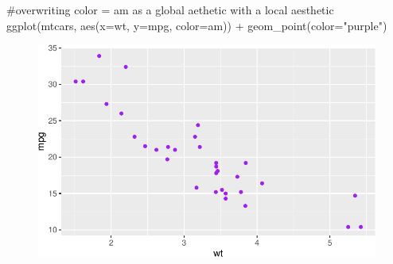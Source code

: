 \documentclass[
  letterpaper,
  DIV=11,
  numbers=noendperiod]{scrartcl}
\newenvironment{Shaded}{\begin{snugshade}}{\end{snugshade}}
\newcommand{\AttributeTok}[1]{\textcolor[rgb]{0.40,0.45,0.13}{#1}}
\newcommand{\CommentTok}[1]{\textcolor[rgb]{0.37,0.37,0.37}{#1}}
\newcommand{\FunctionTok}[1]{\textcolor[rgb]{0.28,0.35,0.67}{#1}}
\newcommand{\NormalTok}[1]{\textcolor[rgb]{0.00,0.23,0.31}{#1}}
\newcommand{\SpecialCharTok}[1]{\textcolor[rgb]{0.37,0.37,0.37}{#1}}
\newcommand{\StringTok}[1]{\textcolor[rgb]{0.13,0.47,0.30}{#1}}
\begin{document}
\begin{Shaded}
\begin{Highlighting}[]
\CommentTok{\#overwriting color = am as a global aethetic with a local aesthetic}
\FunctionTok{ggplot}\NormalTok{(mtcars, }\FunctionTok{aes}\NormalTok{(}\AttributeTok{x=}\NormalTok{wt, }\AttributeTok{y=}\NormalTok{mpg, }\AttributeTok{color=}\NormalTok{am)) }\SpecialCharTok{+}
  \FunctionTok{geom\_point}\NormalTok{(}\AttributeTok{color=}\StringTok{"purple"}\NormalTok{)}
\end{Highlighting}
\end{Shaded}

\begin{figure}[H]

{\centering \includegraphics{118_D_ggplot_files/figure-pdf/unnamed-chunk-15-1.pdf}

}

\end{figure}
\end{document}

